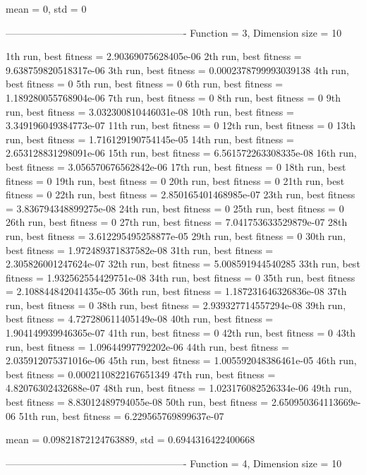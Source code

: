 mean = 0, std = 0

-------------------------------------------------------
Function = 3, Dimension size = 10

1th run, best fitness = 2.90369075628405e-06
2th run, best fitness = 9.638759820518317e-06
3th run, best fitness = 0.0002378799993039138
4th run, best fitness = 0
5th run, best fitness = 0
6th run, best fitness = 1.189280055768904e-06
7th run, best fitness = 0
8th run, best fitness = 0
9th run, best fitness = 3.032300810446031e-08
10th run, best fitness = 3.349196049384773e-07
11th run, best fitness = 0
12th run, best fitness = 0
13th run, best fitness = 1.716129190754145e-05
14th run, best fitness = 2.653128831298091e-06
15th run, best fitness = 6.561572263308335e-08
16th run, best fitness = 3.056570676562842e-06
17th run, best fitness = 0
18th run, best fitness = 0
19th run, best fitness = 0
20th run, best fitness = 0
21th run, best fitness = 0
22th run, best fitness = 2.850165401468985e-07
23th run, best fitness = 3.836794348899275e-08
24th run, best fitness = 0
25th run, best fitness = 0
26th run, best fitness = 0
27th run, best fitness = 7.041753633529879e-07
28th run, best fitness = 3.612295495258877e-05
29th run, best fitness = 0
30th run, best fitness = 1.972489371837582e-08
31th run, best fitness = 2.305826001247624e-07
32th run, best fitness = 5.008591944540285
33th run, best fitness = 1.932562554429751e-08
34th run, best fitness = 0
35th run, best fitness = 2.108844842041435e-05
36th run, best fitness = 1.187231646326836e-08
37th run, best fitness = 0
38th run, best fitness = 2.939327714557294e-08
39th run, best fitness = 4.727280611405149e-08
40th run, best fitness = 1.904149939946365e-07
41th run, best fitness = 0
42th run, best fitness = 0
43th run, best fitness = 1.09644997792202e-06
44th run, best fitness = 2.035912075371016e-06
45th run, best fitness = 1.005592048386461e-05
46th run, best fitness = 0.0002110822167651349
47th run, best fitness = 4.82076302432688e-07
48th run, best fitness = 1.023176082526334e-06
49th run, best fitness = 8.83012489794055e-08
50th run, best fitness = 2.650950364113669e-06
51th run, best fitness = 6.229565769899637e-07

mean = 0.09821872124763889, std = 0.6944316422400668

-------------------------------------------------------
Function = 4, Dimension size = 10

